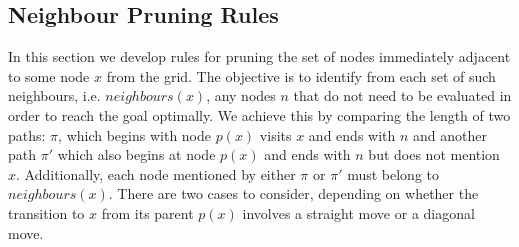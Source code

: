 \subsection{Neighbour Pruning Rules} 
\label{sec:pruning}

In this section we develop rules for pruning the set of nodes immediately 
adjacent to some node $x$ from the grid.
The objective is to identify from each
set of such neighbours, i.e. $neighbours(x)$, any nodes $n$ that do not need to be evaluated in order to
reach the goal optimally. We achieve this by comparing the length of two paths:
$\pi$, which begins with node $p(x)$ visits $x$ and ends with $n$ and another
path $\pi'$ which also begins at node $p(x)$ and ends with $n$ but does not 
mention $x$. 
Additionally, each node mentioned by either $\pi$ or $\pi'$ must belong to 
$neighbours(x)$.
There are two cases to consider, depending on
whether the transition to $x$ from its parent $p(x)$ involves a straight move or
a diagonal move. 

